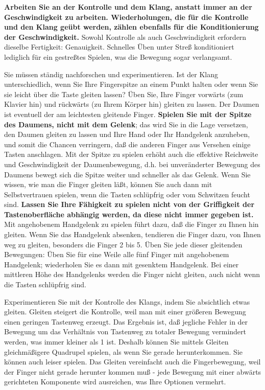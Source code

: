 \textbf{Arbeiten Sie an der Kontrolle und dem Klang, anstatt immer an der Geschwindigkeit zu arbeiten.
Wiederholungen, die für die Kontrolle und den Klang geübt werden, zählen ebenfalls für die Konditionierung der Geschwindigkeit.}
Sowohl Kontrolle als auch Geschwindigkeit erfordern dieselbe Fertigkeit: Genauigkeit.
Schnelles Üben unter Streß konditioniert lediglich für ein gestreßtes Spielen, was die Bewegung sogar verlangsamt.

Sie müssen ständig nachforschen und experimentieren.
Ist der Klang unterschiedlich, wenn Sie Ihre Fingerspitze an einem Punkt halten oder wenn Sie sie leicht über die Taste gleiten lassen?
Üben Sie, Ihre Finger vorwärts (zum Klavier hin) und rückwärts (zu Ihrem Körper hin) gleiten zu lassen.
Der Daumen ist eventuell der am leichtesten gleitende Finger.
\textbf{Spielen Sie mit der Spitze des Daumens, nicht mit dem Gelenk}; das wird Sie in die Lage versetzen, den Daumen gleiten zu lassen und Ihre Hand oder Ihr Handgelenk anzuheben, und somit die Chancen verringern, daß die anderen Finger aus Versehen einige Tasten anschlagen.
Mit der Spitze zu spielen erhöht auch die effektive Reichweite und Geschwindigkeit der Daumenbewegung, d.h. bei unveränderter Bewegung des Daumens bewegt sich die Spitze weiter und schneller als das Gelenk.
Wenn Sie wissen, wie man die Finger gleiten läßt, können Sie auch dann mit Selbstvertrauen spielen, wenn die Tasten schlüpfrig oder vom Schwitzen feucht sind.
\textbf{Lassen Sie Ihre Fähigkeit zu spielen nicht von der Griffigkeit der Tastenoberfläche abhängig werden, da diese nicht immer gegeben ist.}
Mit angehobenem Handgelenk zu spielen führt dazu, daß die Finger zu Ihnen hin gleiten.
Wenn Sie das Handgelenk absenken, tendieren die Finger dazu, von Ihnen weg zu gleiten, besonders die Finger 2 bis 5.
Üben Sie jede dieser gleitenden Bewegungen: Üben Sie für eine Weile alle fünf Finger mit angehobenem Handgelenk; wiederholen Sie es dann mit gesenktem Handgelenk.
Bei einer mittleren Höhe des Handgelenks werden die Finger nicht gleiten, auch nicht wenn die Tasten schlüpfrig sind.

Experimentieren Sie mit der Kontrolle des Klangs, indem Sie absichtlich etwas gleiten.
Gleiten steigert die Kontrolle, weil man mit einer größeren Bewegung einen geringen Tastenweg erzeugt.
Das Ergebnis ist, daß jegliche Fehler in der Bewegung um das Verhältnis von Tastenweg zu totaler Bewegung vermindert werden, was immer kleiner als 1 ist.
Deshalb können Sie mittels Gleiten gleichmäßigere Quadrupel spielen, als wenn Sie gerade herunterkommen.
Sie können auch leiser spielen.
Das Gleiten vereinfacht auch die Fingerbewegung, weil der Finger nicht gerade herunter kommen muß - jede Bewegung mit einer abwärts gerichteten Komponente wird ausreichen, was Ihre Optionen vermehrt.

